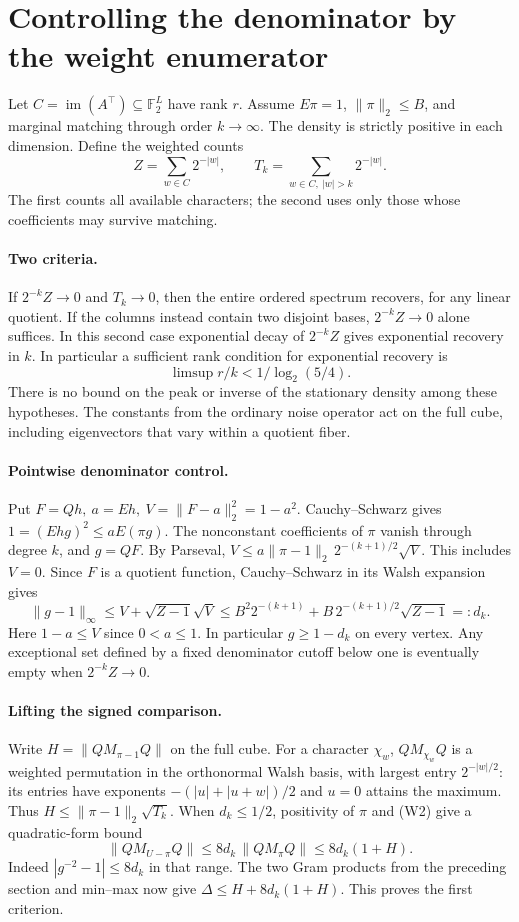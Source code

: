 \section{Controlling the denominator by the weight enumerator}
\label{sec:enumerator}
Let \(C=\operatorname{im}(A^\top)\subseteq\mathbb F_2^L\) have rank \(r\).
Assume \(E\pi=1\), \(\|\pi\|_2\le B\), and marginal matching through order
\(k\to\infty\). The density is strictly positive in each dimension.
Define the weighted counts
\[
 Z=\sum_{w\in C}2^{-|w|},\qquad T_k=\sum_{w\in C,\ |w|>k}2^{-|w|}.
\]
The first counts all available characters; the second uses only those
whose coefficients may survive matching.

\paragraph{Two criteria.}
If \(2^{-k} Z\to0\) and \(T_k\to0\), then the entire ordered spectrum
recovers, for any linear quotient. If the columns instead contain two
disjoint bases, \(2^{-k} Z\to0\) alone suffices. In this second case
exponential decay of \(2^{-k} Z\) gives exponential recovery in \(k\).
In particular a sufficient rank condition for exponential recovery is
\[
 \limsup r/k<1/\log_2(5/4).
 \tag{W1}
\]
There is no bound on the peak or inverse of the stationary density among
these hypotheses. The constants from the ordinary noise operator act on
the full cube, including eigenvectors that vary within a quotient fiber.

\paragraph{Pointwise denominator control.}
Put \(F=Qh,\ a=Eh,\ V=\|F-a\|_2^2=1-a^2\).
Cauchy--Schwarz gives \(1=(Ehg)^2\le a E(\pi g)\).
The nonconstant coefficients of \(\pi\) vanish through degree \(k\), and
\(g=QF\). By Parseval,
\(V\le a\|\pi-1\|_2\,2^{-(k+1)/2}\sqrt V\).
This includes \(V=0\). Since \(F\) is a quotient function, Cauchy--Schwarz
in its Walsh expansion gives
\[
 \|g-1\|_\infty\le V+\sqrt{Z-1}\sqrt V
 \le B^2 2^{-(k+1)} + B\,2^{-(k+1)/2}\sqrt{Z-1}=:d_k .
 \tag{W2}
\]
Here \(1-a\le V\) since \(0<a\le1\).
In particular \(g\ge 1-d_k\) on every vertex. Any exceptional set defined
by a fixed denominator cutoff below one is eventually empty when
\(2^{-k} Z\to0\).

\paragraph{Lifting the signed comparison.}
Write \(H=\|QM_{\pi-1}Q\|\) on the full cube. For a character \(\chi_w\),
\(QM_{\chi_w}Q\) is a weighted permutation in the orthonormal Walsh basis,
with largest entry \(2^{-|w|/2}\): its entries have exponents
\(-(|u|+|u+w|)/2\) and \(u=0\) attains the maximum. Thus
\(H\le\|\pi-1\|_2\sqrt{T_k}\). When \(d_k\le1/2\), positivity of \(\pi\)
and (W2) give a quadratic-form bound
\[
 \|QM_{U-\pi}Q\|\le 8d_k\,\|QM_\pi Q\|\le8d_k(1+H).
\]
Indeed \(|g^{-2}-1|\le 8d_k\) in that range.
The two Gram products from the preceding section and min--max now give
\(\Delta\le H+8d_k(1+H)\). This proves the first criterion.

